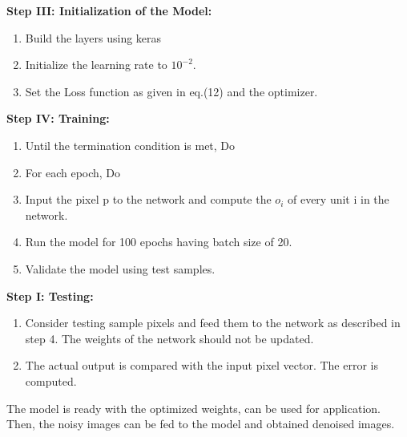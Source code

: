 \documentclass{article}
\begin{document}
\begin{flushleft}
\textbf{Step III: Initialization of the Model:}
\end{flushleft}

\begin{enumerate}

\item Build the layers using keras
\item Initialize the learning rate to $10^{-2}$.
\item Set the Loss function as given in eq.(12) and the optimizer.\\

\end{enumerate}

\begin{flushleft}
\textbf{Step IV: Training:}
\end{flushleft}

\begin{enumerate}

\item Until the termination condition is met, Do
\item For each epoch, Do
\item Input the pixel p to the network and compute the $o_{i}$ of every unit i in the network.
\item Run the model for 100 epochs having batch size of 20.
\item Validate the model using test samples.\\

\end{enumerate}


\begin{flushleft}
\textbf{Step I: Testing:}
\end{flushleft}

\begin{enumerate}

\item Consider testing sample pixels and feed them to the network as described in step 4. The weights of the network should not be updated.
\item The actual output is compared with the input pixel vector. The error is computed.\\

\end{enumerate}

The model is ready with the optimized weights, can be used for application.
Then, the noisy images can be fed to the model and obtained denoised images.\\
\end{document}
